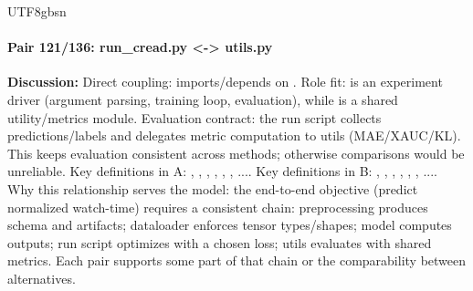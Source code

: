 \documentclass[11pt]{article}
\begin{document}
\begin{CJK*}{UTF8}{gbsn}
\paragraph{Pair 121/136: run\_cread.py <-> utils.py}
\textbf{Discussion:} Direct coupling: \texttt{} imports/depends on \texttt{}. Role fit: \texttt{} is an experiment driver (argument parsing, training loop, evaluation), while \texttt{} is a shared utility/metrics module. Evaluation contract: the run script collects predictions/labels and delegates metric computation to utils (MAE/XAUC/KL). This keeps evaluation consistent across methods; otherwise comparisons would be unreliable. Key definitions in A: \texttt{}, \texttt{}, \texttt{}, \texttt{}, \texttt{}, \texttt{}, .... Key definitions in B: \texttt{}, \texttt{}, \texttt{}, \texttt{}, \texttt{}, \texttt{}, .... Why this relationship serves the model: the end-to-end objective (predict normalized watch-time) requires a consistent chain: preprocessing produces schema and artifacts; dataloader enforces tensor types/shapes; model computes outputs; run script optimizes with a chosen loss; utils evaluates with shared metrics. Each pair supports some part of that chain or the comparability between alternatives.


\end{CJK*}
\end{document}
